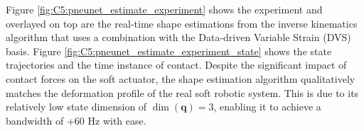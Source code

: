 Figure \ref{fig:C5:pneunet_estimate_experiment} shows the experiment and overlayed on top are the real-time shape estimations from the inverse kinematics algorithm that uses a combination with the Data-driven Variable Strain (DVS) basis. Figure \ref{fig:C5:pneunet_estimate_experiment_state} shows the state trajectories and the time instance of contact. Despite the significant impact of contact forces on the soft actuator, the shape estimation algorithm qualitatively matches the deformation profile of the real soft robotic system. This is due to its relatively low state dimension of $\dim(\mathbf{q}) = 3$, enabling it to achieve a bandwidth of +60 \si{\hertz} with ease.
